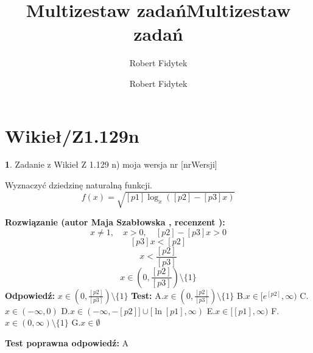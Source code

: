 \documentclass[12pt, a4paper]{article}
\title{Multizestaw zadań}
\author{Robert Fidytek}
\date{}\documentclass[12pt, a4paper]{article}
\title{Multizestaw zadań}
\author{Robert Fidytek}
\date{}
\theoremstyle{definition} %
\newtheorem{zad}{}
\theoremstyle{definition} %
\newtheorem{zad}{}
\newcommand{\kategoria}[1]{\section{#1}} %
\newcommand{\zadStart}[1]{\begin{zad}#1\newline} %
\newcommand{\zadStop}{\end{zad}}   %
\newcommand{\rozwStart}[2]{\noindent \textbf{Rozwiązanie (autor #1 , recenzent #2): }\newline} %
\newcommand{\rozwStop}{\newline}                                            %
\newcommand{\odpStart}{\noindent \textbf{Odpowiedź:}\newline}    %
\newcommand{\odpStop}{\newline}                                             %
\newcommand{\testStart}{\noindent \textbf{Test:}\newline} %
\newcommand{\testStop}{\newline} %
\newcommand{\kluczStart}{\noindent \textbf{Test poprawna odpowiedź:}\newline} %
\newcommand{\kluczStop}{\newline} %
\begin{document}
\maketitle


\kategoria{Wikieł/Z1.129n}
\zadStart{Zadanie z Wikieł Z 1.129 n) moja wersja nr [nrWersji]}

Wyznaczyć dziedzinę naturalną funkcji.
$$f(x)=\sqrt{[p1]\log_{x}([p2]-[p3]x)}$$

\zadStop

\rozwStart{Maja Szabłowska}{}
$$x\neq1, \quad x>0, \quad [p2]-[p3]x>0 $$
$$[p3]x<[p2]$$
$$x<\frac{[p2]}{[p3]}$$
$$x\in\left(0,\frac{[p2]}{[p3]}\right)\setminus\{1\}$$
\rozwStop
\odpStart
$x\in\left(0,\frac{[p2]}{[p3]}\right)\setminus\{1\}$
\odpStop
\testStart
A.$x\in\left(0,\frac{[p2]}{[p3]}\right)\setminus\{1\}$
B.$x\in[e^{[p2]},\infty)$
C.$x\in(-\infty, 0)$
D.$x\in(-\infty, -[p2]] \cup [\ln[p1],\infty)$
E.$x\in[[p1],\infty)$
F.$x\in(0,\infty)\setminus\{1\}$
G.$x\in\emptyset$

\testStop
\kluczStart
A
\kluczStop
\end{document}
